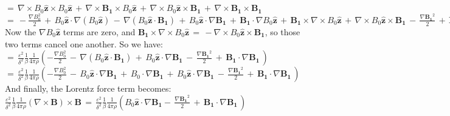 \documentclass[letterpaper,12pt]{article}
\begin{document}
$= \, \nabla \times B_0 \mathbf{\hat{z}} \times B_0 \mathbf{\hat{z}} \, +\, \nabla \times \mathbf{B_1} \times B_0 \mathbf{\hat{z}} \, + \, \nabla \times B_0 \mathbf{\hat{z}} \times \mathbf{B_1} \, + \, \nabla \times \mathbf{B_1} \times \mathbf{B_1}$\\

$= \, -\frac{\nabla B_0^2}{2} \, + \, B_0 \mathbf{\hat{z}} \cdot \nabla \left(B_0 \mathbf{\hat{z}}\right) \, - \, \nabla\left(B_0 \mathbf{\hat{z}} \cdot \mathbf{B_1}\right) \, + \, B_0 \mathbf{\hat{z}} \cdot \nabla \mathbf{B_1} \, + \, \mathbf{B_1} \cdot \nabla B_0 \mathbf{\hat{z}} \, + \, \mathbf{B_1} \times \nabla \times B_0 \mathbf{\hat{z}} \, + \, \nabla \times B_0 \mathbf{\hat{z}} \times \mathbf{B_1} \, - \, \frac{\nabla \mathbf{B_1}^2}{2} \, + \, \mathbf{B_1} \cdot \nabla \mathbf{B_1}$ \\

Now the $\nabla B_0 \mathbf{\hat{z}}$ terms are zero, and $\mathbf{B_1} \times \nabla \times B_0 \mathbf{\hat{z}} \, = \, - \nabla \times B_0 \mathbf{\hat{z}} \times \mathbf{B_1}$, so those two terms cancel one another. So we have: \\

$ = \, \frac{\varepsilon^2}{\delta^2} \frac{1}{\beta} \frac{1}{4 \pi \rho} \left(-\frac{\nabla B_0^2}{2} \, - \, \nabla \left(B_0 \mathbf{\hat{z}}\cdot \mathbf{B_1}\right)\, + \, B_0 \mathbf{\hat{z}} \cdot \nabla \mathbf{B_1} \, - \, \frac{\nabla \mathbf{B_1}^2}{2} \, + \, \mathbf{B_1}\cdot \nabla \mathbf{B_1} \, \right)$ \\

$ = \, \frac{\varepsilon^2}{\delta^2} \frac{1}{\beta} \frac{1}{4 \pi \rho} \left(-\frac{\nabla B_0^2}{2} \, - \, B_0 \mathbf{\hat{z}} \cdot \nabla \mathbf{B_1} \, + \, B_0 \cdot \nabla \mathbf{B_1} \,+ \, B_0 \mathbf{\hat{z}} \cdot \nabla \mathbf{B_1} \, - \, \frac{\nabla\mathbf{B_1}^2}{2} \, + \, \mathbf{B_1}\cdot \nabla \mathbf{B_1} \, \right)$ \\

And finally, the Lorentz force term becomes: \\

$\frac{\varepsilon^2}{\delta^2} \frac{1}{\beta} \frac{1}{4 \pi \rho} \left( \nabla \times \mathbf{B} \right) \times \mathbf{B} \, = \, \frac{\varepsilon^2}{\delta^2} \frac{1}{\beta} \frac{1}{4 \pi \rho} \left(B_0 \mathbf{\hat{z}} \cdot \nabla \mathbf{B_1} - \, \frac{\nabla \mathbf{B_1}^2}{2} \, + \, \mathbf{B_1}\cdot \nabla \mathbf{B_1} \, \right)$ \\
\end{document}
